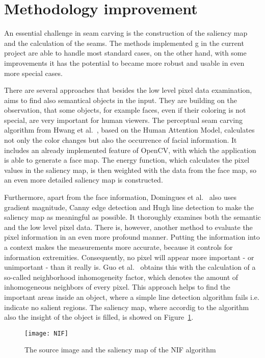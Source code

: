 \documentclass[draft,final]{vutinfth} %
\begin{document}
	\section{Methodology improvement}
	An essential challenge in seam carving is the construction of the saliency map and the calculation of the seams. 
	The methods implemented g in the current project are able to handle most standard cases, on the other hand, with some improvements it has the potential to became more robust and usable in even more special cases.\par 
	There are several approaches that besides the low level pixel data examination, aims to find also semantical objects in the input.
	They are building on the observation, that some objects, for example faces, even if their coloring is not special, are very important for human viewers.
	The perceptual seam carving algorithm from Hwang et al.~\cite{hwang2008content}, based on the Human Attention Model, calculates not only the color changes but also the occurrence of facial information.
	It includes an already implemented feature of OpenCV, with which the application is able to generate a face map.
	The energy function, which calculates the pixel values in the saliency map, is then weighted with the data from the face map, so an even more detailed saliency map is constructed.\par 
	Furthermore, apart from the face information, Domingues et al.~\cite{domingues2010stream} also uses gradient magnitude, Canny edge detection and Hugh line detection to make the saliency map as meaningful as possible. 
	It thoroughly examines both the semantic and the low level pixel data.
	There is, however, another method to evaluate the pixel information in an even more profound manner.
	Putting the information into a context makes the measurements more accurate, because it controls for information extremities.
	Consequently, no pixel will appear more important - or unimportant - than it really is.
	Guo et al.~\cite{guo2015nif} obtains this with the calculation of a so-called neighborhood inhomogeneity factor, which denotes the amount of inhomogeneous neighbors of every pixel. 
	This approach helps to find the important areas inside an object, where a simple line detection algorithm fails i.e. indicate no salient regions.
	The saliency map, where accordig to the algorithm also the insight of the object is filled, is showed on Figure~\ref{fig:nif}.
	\begin{figure}[H]
		\centering		
		\texttt{[image: NIF]}
		\caption{The source image and the saliency map of the NIF algorithm ~\cite{guo2015nif} }
		\label{fig:nif}
	\end{figure}
\end{document}
